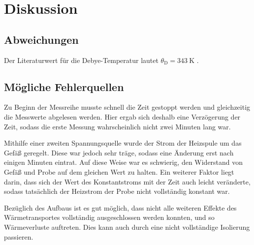 \section{Diskussion}
\label{sec:diskussion}

\subsection{Abweichungen}

    Der Literaturwert für die Debye-Temperatur lautet $\theta_\text{D} = \SI{343}{\kelvin}$ \cite[Abbildung 6.9]{grossmarx}.


\subsection{Mögliche Fehlerquellen}

    Zu Beginn der Messreihe musste schnell die Zeit gestoppt werden und gleichzeitig die Messwerte abgelesen werden.
    Hier ergab sich deshalb eine Verzögerung der Zeit,
    sodass die erste Messung wahrscheinlich nicht zwei Minuten lang war.

    Mithilfe einer zweiten Spannungsquelle wurde der Strom der Heizspule um das Gefäß geregelt.
    Diese war jedoch sehr träge,
    sodass eine Änderung erst nach einigen Minuten eintrat.
    Auf diese Weise war es schwierig,
    den Widerstand von Gefäß und Probe auf dem gleichen Wert zu halten.
    Ein weiterer Faktor liegt darin,
    dass sich der Wert des Konstantstroms mit der Zeit auch leicht veränderte,
    sodass tatsächlich der Heizstrom der Probe nicht vollständig konstant war.

    Bezüglich des Aufbaus ist es gut möglich,
    dass nicht alle weiteren Effekte des Wärmetransportes vollständig ausgeschlossen werden konnten,
    und so Wärmeverluste auftreten.
    Dies kann auch durch eine nicht vollständige Isolierung passieren.
